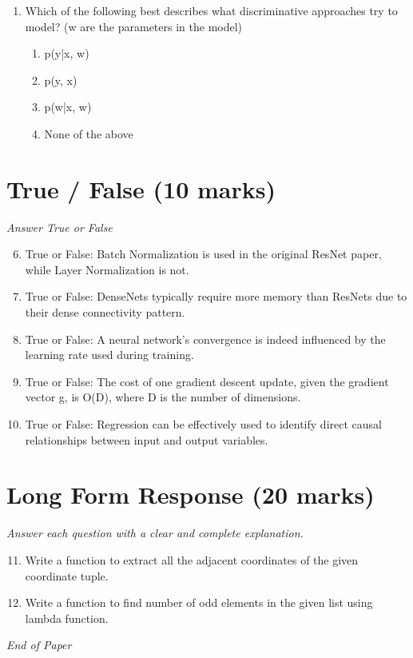 \documentclass[12pt]{article}
\begin{document}
\begin{enumerate}[label=\arabic*.]
\begin{enumerate}[label=(\alph*)]
    \item P(H, U, P, W) = P(H) * P(W) * P(P | W) * P(W | H, P)
    \item P(H, U, P, W) = P(H) * P(W) * P(P | W) * P(U | H, P)
    \item None of the above
\end{enumerate}
\item Which of the following best describes what discriminative approaches try to model? (w are the parameters in the model)
\begin{enumerate}[label=(\alph*)]
    \item p(y|x, w)
    \item p(y, x)
    \item p(w|x, w)
    \item None of the above
\end{enumerate}
\end{enumerate}

\section*{True / False (10 marks)}
\textit{Answer True or False}
\begin{enumerate}[label=\arabic*.]
\setcounter{enumi}{5}
\item True or False: Batch Normalization is used in the original ResNet paper, while Layer Normalization is not.
\item True or False: DenseNets typically require more memory than ResNets due to their dense connectivity pattern.
\item True or False: A neural network's convergence is indeed influenced by the learning rate used during training.
\item True or False: The cost of one gradient descent update, given the gradient vector g, is O(D), where D is the number of dimensions.
\item True or False: Regression can be effectively used to identify direct causal relationships between input and output variables.
\end{enumerate}

\section*{Long Form Response (20 marks)}
\textit{Answer each question with a clear and complete explanation.}
\begin{enumerate}[label=\arabic*.]
\setcounter{enumi}{10}
\item Write a function to extract all the adjacent coordinates of the given coordinate tuple.
\item Write a function to find number of odd elements in the given list using lambda function.
\end{enumerate}

\vfill
\noindent\textit{End of Paper}
\end{document}
